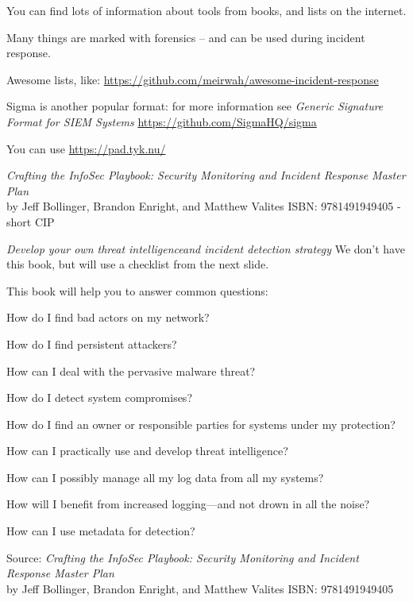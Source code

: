 \documentclass[Screen16to9,17pt]{foils}
\begin{document}







You can find lots of information about tools from books, and lists on the internet.

Many things are marked with forensics -- and can be used during incident response.

\begin{list2}
    \item Awesome lists, like: \url{https://github.com/meirwah/awesome-incident-response}
    \item Sigma is another popular format: for more information see \emph{Generic Signature Format for SIEM Systems}
    \url{https://github.com/SigmaHQ/sigma}
\end{list2}



You can use \url{https://pad.tyk.nu/}



\emph{Crafting the InfoSec Playbook: Security Monitoring and Incident Response Master Plan}\\
 by Jeff Bollinger, Brandon Enright, and Matthew Valites ISBN: 9781491949405 - short CIP

\emph{Develop your own threat intelligenceand incident detection strategy}
We don't have this book, but will use a checklist from the next slide.



This book will help you to answer common questions:
\begin{list2}
\item How do I find bad actors on my network?
\item How do I find persistent attackers?
\item How can I deal with the pervasive malware threat?
\item How do I detect system compromises?
\item How do I find an owner or responsible parties for systems under my protection?
\item How can I practically use and develop threat intelligence?
\item How can I possibly manage all my log data from all my systems?
\item How will I benefit from increased logging—and not drown in all the noise?
\item How can I use metadata for detection?
\end{list2}
Source: \emph{Crafting the InfoSec Playbook: Security Monitoring and Incident Response Master Plan}\\
 by Jeff Bollinger, Brandon Enright, and Matthew Valites ISBN: 9781491949405
\end{document}
